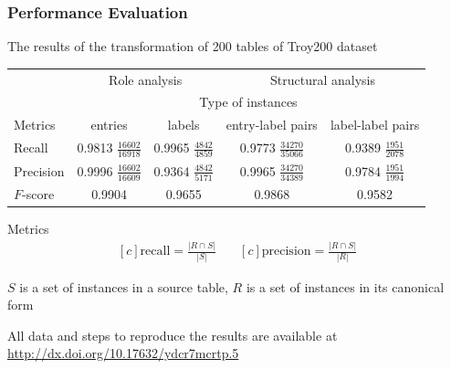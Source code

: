 \documentclass[10pt]{beamer}
\begin{document}
\begin{frame}
\frametitle{Performance Evaluation}
\small{The results of the transformation of 200 tables of Troy200 dataset}
\footnotesize{
\begin{table}
		\centering
		    \bgroup
        \def\arraystretch{1.5}
				\begin{tabular}{|l|c|c|c|c|}
						\hline
														& \multicolumn{2}{|c|}{Role analysis} & \multicolumn{2}{|c|}{Structural analysis} \\
														\cline{2-5}
														& \multicolumn{4}{|c|}{Type of instances} \\
														\cline{2-5}
			            Metrics   & entries                      & labels                     & entry-label pairs            & label-label pairs  \\
			      \hline
			            Recall    & 0.9813 $\frac{16602}{16918}$ & 0.9965 $\frac{4842}{4859}$ & 0.9773 $\frac{34270}{35066}$ & 0.9389 $\frac{1951}{2078}$ \\
			            Precision & 0.9996 $\frac{16602}{16609}$ & 0.9364 $\frac{4842}{5171}$ & 0.9965 $\frac{34270}{34389}$ & 0.9784 $\frac{1951}{1994}$ \\
									$F$-score & 0.9904                       & 0.9655                     & 0.9868                       & 0.9582                     \\
			      \hline
		    \end{tabular}
				\egroup
\end{table}
}
\begin{block}{\small Metrics}
\footnotesize{
\begin{equation*}
\begin{aligned}[c]
\text{recall} = \frac{\left|R \cap S\right|}{\left|S\right|}
\end{aligned}
\quad
\begin{aligned}[c]
\text{precision} = \frac{\left|R \cap S\right|}{\left|R\right|}
\end{aligned}
\end{equation*}
}
\scriptsize{\centerline{$S$ is a set of instances in a source table, $R$ is a set of instances in its canonical form}}
\end{block}
\tiny All data and steps to reproduce the results are available at \url{http://dx.doi.org/10.17632/ydcr7mcrtp.5}
\end{frame}
\end{document}
